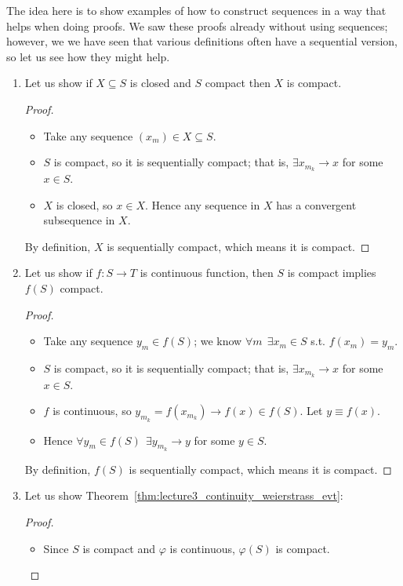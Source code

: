 \documentclass{article}
\theoremstyle{mythm}
\theoremstyle{mydef}
\begin{document}
The idea here is to show examples of how to construct sequences in a way that helps when doing proofs. We saw these proofs already without using sequences; however, we we have seen that various definitions often have a sequential version, so let us see how they might help.
\begin{enumerate}
  \item Let us show if $X \subseteq S$ is closed and $S$ compact then $X$ is compact.
    \begin{proof}
      \begin{itemize}
        \item Take any sequence $(x_m) \in X \subseteq S$.

        \item $S$ is compact, so it is sequentially compact; that is, $\exists x_{m_k} \to x$ for some $x \in S$.

        \item $X$ is closed, so $x \in X$. Hence any sequence in $X$ has a convergent subsequence in $X$.
      \end{itemize}

      By definition, $X$ is sequentially compact, which means it is compact.
    \end{proof}

  \item Let us show if $f: S \to T$ is continuous function, then $S$ is compact implies $f(S)$ compact.
    \begin{proof}
      \begin{itemize}
        \item Take any sequence $y_m \in f(S)$; we know $\forall m ~~ \exists x_m \in S$ s.t. $f(x_m) = y_m$.

        \item $S$ is compact, so it is sequentially compact; that is, $\exists x_{m_k} \to x$ for some $x \in S$.

        \item $f$ is continuous, so $y_{m_k} = f(x_{m_k}) \to f(x) \in f(S)$. Let $y \equiv f(x)$.

        \item Hence $\forall y_m \in f(S) ~~ \exists y_{m_k} \to y$ for some $y \in S$.
      \end{itemize}

      By definition, $f(S)$ is sequentially compact, which means it is compact.
    \end{proof}

  \item Let us show Theorem~\ref{thm:lecture3_continuity_weierstrass_evt}:
    \begin{proof}
      \begin{itemize}
        \item Since $S$ is compact and $\varphi$ is continuous, $\varphi(S)$ is compact.


\end{itemize}
\end{proof}
\end{enumerate}
\end{document}
